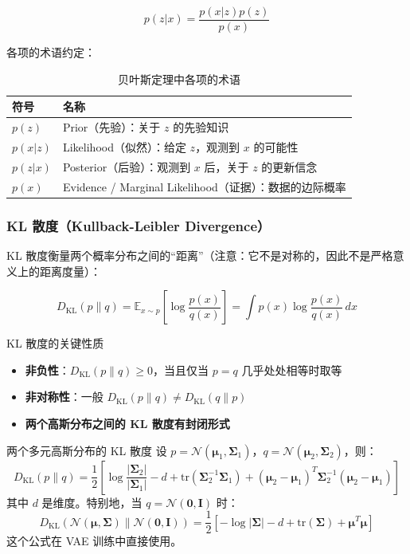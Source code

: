 \documentclass[a4paper]{article}
\begin{document}
$$p(z|x) = \frac{p(x|z) p(z)}{p(x)}$$

各项的术语约定：

\begin{table}[H]
\centering
\begin{tabular}{ll}
\toprule
符号 & 名称 \\
\midrule
$p(z)$ & Prior（先验）：关于 $z$ 的先验知识 \\
$p(x|z)$ & Likelihood（似然）：给定 $z$，观测到 $x$ 的可能性 \\
$p(z|x)$ & Posterior（后验）：观测到 $x$ 后，关于 $z$ 的更新信念 \\
$p(x)$ & Evidence / Marginal Likelihood（证据）：数据的边际概率 \\
\bottomrule
\end{tabular}
\caption{贝叶斯定理中各项的术语}
\end{table}

\subsubsection{KL 散度（Kullback-Leibler Divergence）}

KL 散度衡量两个概率分布之间的``距离''（注意：它不是对称的，因此不是严格意义上的距离度量）：

$$D_{\mathrm{KL}}(p \| q) = \mathbb{E}_{x \sim p} \left[\log \frac{p(x)}{q(x)}\right] = \int p(x) \log \frac{p(x)}{q(x)} \, dx$$

\begin{importantbox}{KL 散度的关键性质}
\begin{itemize}
    \item \textbf{非负性}：$D_{\mathrm{KL}}(p \| q) \geq 0$，当且仅当 $p = q$ 几乎处处相等时取等
    \item \textbf{非对称性}：一般 $D_{\mathrm{KL}}(p \| q) \neq D_{\mathrm{KL}}(q \| p)$
    \item \textbf{两个高斯分布之间的 KL 散度有封闭形式}
\end{itemize}
\end{importantbox}

\begin{knowledgebox}{两个多元高斯分布的 KL 散度}
设 $p = \mathcal{N}(\boldsymbol{\mu}_1, \boldsymbol{\Sigma}_1)$，$q = \mathcal{N}(\boldsymbol{\mu}_2, \boldsymbol{\Sigma}_2)$，则：
$$D_{\mathrm{KL}}(p \| q) = \frac{1}{2}\left[\log\frac{|\boldsymbol{\Sigma}_2|}{|\boldsymbol{\Sigma}_1|} - d + \mathrm{tr}(\boldsymbol{\Sigma}_2^{-1}\boldsymbol{\Sigma}_1) + (\boldsymbol{\mu}_2 - \boldsymbol{\mu}_1)^T \boldsymbol{\Sigma}_2^{-1} (\boldsymbol{\mu}_2 - \boldsymbol{\mu}_1)\right]$$
其中 $d$ 是维度。特别地，当 $q = \mathcal{N}(\mathbf{0}, \mathbf{I})$ 时：
$$D_{\mathrm{KL}}(\mathcal{N}(\boldsymbol{\mu}, \boldsymbol{\Sigma}) \| \mathcal{N}(\mathbf{0}, \mathbf{I})) = \frac{1}{2}\left[-\log|\boldsymbol{\Sigma}| - d + \mathrm{tr}(\boldsymbol{\Sigma}) + \boldsymbol{\mu}^T\boldsymbol{\mu}\right]$$
这个公式在 VAE 训练中直接使用。
\end{knowledgebox}
\end{document}
